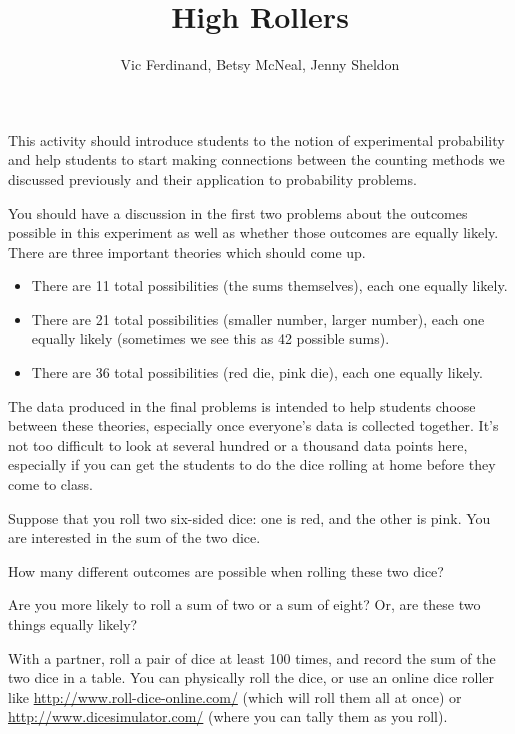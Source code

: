 \documentclass{ximera}
\title{High Rollers}
\author{Vic Ferdinand, Betsy McNeal, Jenny Sheldon}
\begin{document}
\begin{abstract}
\end{abstract}
\maketitle

\begin{instructorIntro}
This activity should introduce students to the notion of experimental probability and help students to start making connections between the counting methods we discussed previously and their application to probability problems.

You should have a discussion in the first two problems about the outcomes possible in this experiment as well as whether those outcomes are equally likely.  There are three important theories which should come up.
\begin{itemize}
	\item There are 11 total possibilities (the sums themselves), each one equally likely.
	\item There are 21 total possibilities (smaller number, larger number), each one equally likely (sometimes we see this as 42 possible sums).
	\item There are 36 total possibilities (red die, pink die), each one equally likely.
\end{itemize}
The data produced in the final problems is intended to help students choose between these theories, especially once everyone's data is collected together.  It's not too difficult to look at several hundred or a thousand data points here, especially if you can get the students to do the dice rolling at home before they come to class.

\end{instructorIntro}

Suppose that you roll two six-sided dice: one is red, and the other is pink.  You are interested in the sum of the two dice.

\begin{problem}
How many different outcomes are possible when rolling these two dice?
\end{problem}

\begin{problem} 
Are you more likely to roll a sum of two or a sum of eight?  Or, are these two things equally likely?
\end{problem}

With a partner, roll a pair of dice at least 100 times, and record the sum of the two dice in a table.  You can physically roll the dice, or use an online dice roller like \url{http://www.roll-dice-online.com/} (which will roll them all at once) or \url{http://www.dicesimulator.com/} (where you can tally them as you roll).
\end{document}
